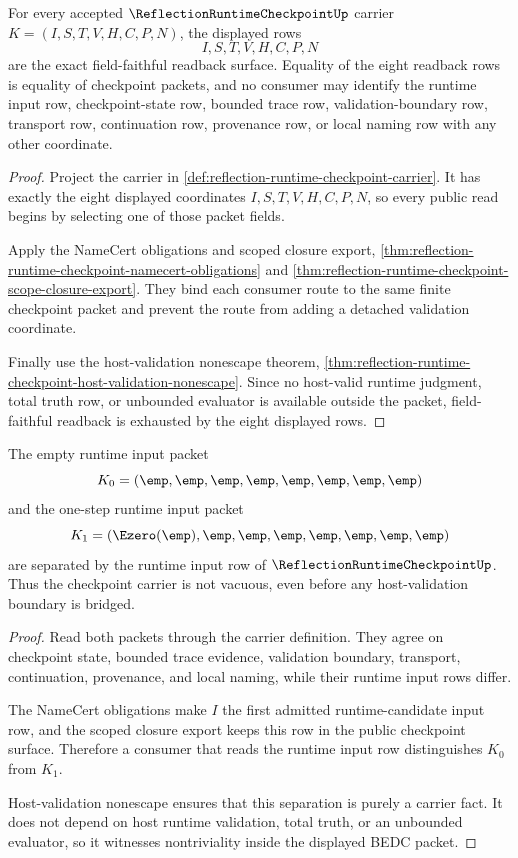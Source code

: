 \begin{theorem}
\label{thm:reflection-runtime-checkpoint-tastegate-fieldfaithful-row}
For every accepted $\ReflectionRuntimeCheckpointUp$ carrier $K=(I,S,T,V,H,C,P,N)$, the displayed rows
$$
I,S,T,V,H,C,P,N
$$
are the exact field-faithful readback surface. Equality of the eight readback rows is equality of checkpoint packets, and no consumer may identify the runtime input row, checkpoint-state row, bounded trace row, validation-boundary row, transport row, continuation row, provenance row, or local naming row with any other coordinate.
\end{theorem}
\begin{proof}
Project the carrier in \autoref{def:reflection-runtime-checkpoint-carrier}. It has exactly the eight displayed coordinates $I,S,T,V,H,C,P,N$, so every public read begins by selecting one of those packet fields.

Apply the NameCert obligations and scoped closure export, \autoref{thm:reflection-runtime-checkpoint-namecert-obligations} and \autoref{thm:reflection-runtime-checkpoint-scope-closure-export}. They bind each consumer route to the same finite checkpoint packet and prevent the route from adding a detached validation coordinate.

Finally use the host-validation nonescape theorem, \autoref{thm:reflection-runtime-checkpoint-host-validation-nonescape}. Since no host-valid runtime judgment, total truth row, or unbounded evaluator is available outside the packet, field-faithful readback is exhausted by the eight displayed rows.
\end{proof}

\begin{theorem}
\label{thm:reflection-runtime-checkpoint-nontrivial-witness-row}
The empty runtime input packet
$$
K_0=(\emp,\emp,\emp,\emp,\emp,\emp,\emp,\emp)
$$
and the one-step runtime input packet
$$
K_1=(\Ezero(\emp),\emp,\emp,\emp,\emp,\emp,\emp,\emp)
$$
are separated by the runtime input row of $\ReflectionRuntimeCheckpointUp$. Thus the checkpoint carrier is not vacuous, even before any host-validation boundary is bridged.
\end{theorem}
\begin{proof}
Read both packets through the carrier definition. They agree on checkpoint state, bounded trace evidence, validation boundary, transport, continuation, provenance, and local naming, while their runtime input rows differ.

The NameCert obligations make $I$ the first admitted runtime-candidate input row, and the scoped closure export keeps this row in the public checkpoint surface. Therefore a consumer that reads the runtime input row distinguishes $K_0$ from $K_1$.

Host-validation nonescape ensures that this separation is purely a carrier fact. It does not depend on host runtime validation, total truth, or an unbounded evaluator, so it witnesses nontriviality inside the displayed BEDC packet.
\end{proof}

